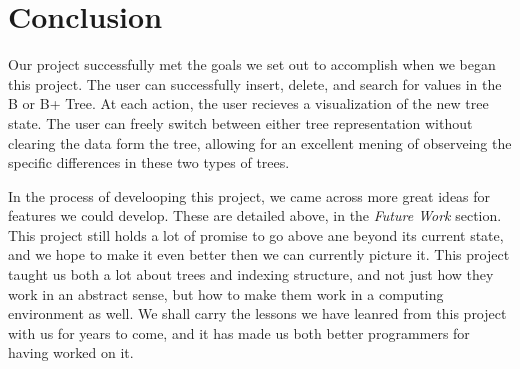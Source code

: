 \section{Conclusion}

Our project successfully met the goals we set out to accomplish when
we began this project. The user can successfully insert, delete, and
search for values in the B or B+ Tree. At each action, the user
recieves a visualization of the new tree state.  The user can freely 
switch between either tree representation without clearing the data 
form the tree, allowing for an excellent mening of observeing the 
specific differences in these two types of trees.

In the process of develooping this project, we came across more great
ideas for features we could develop. These are detailed above, in the
\textit{Future Work} section.  This project still holds a lot of 
promise to go above ane beyond its current state, and we hope to make 
it even better then we can currently picture it.  This project taught 
us both a lot about trees and indexing structure, and not just how 
they work in an abstract sense, but how to make them work in a 
computing environment as well.  We shall carry the lessons we have 
leanred from this project with us for years to come, and it has made 
us both better programmers for having worked on it.
